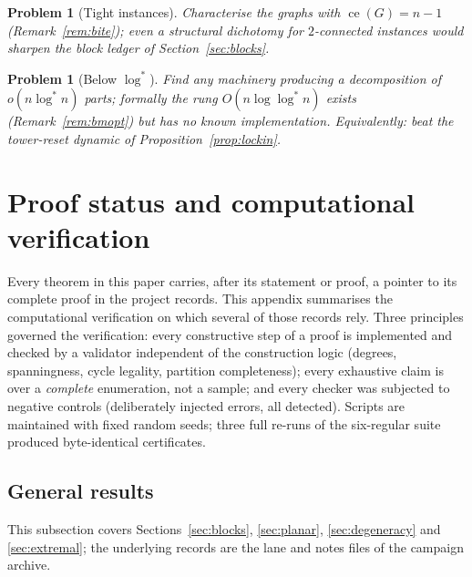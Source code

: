 \documentclass[a4paper,11pt]{amsart}
\newtheorem{problem}[theorem]{Problem}
\theoremstyle{definition}
\theoremstyle{remark}
\newcommand{\ce}{\operatorname{ce}}
\begin{document}
\begin{problem}[Tight instances]\label{prob:tight}
Characterise the graphs with $\ce(G)=n-1$ (Remark~\ref{rem:bite}); even a structural dichotomy for
$2$-connected instances would sharpen the block ledger of Section~\ref{sec:blocks}.
\end{problem}

\begin{problem}[Below $\log^*$]\label{prob:belowlogstar}
Find any machinery producing a decomposition of $o(n\log^* n)$ parts; formally the rung
$O(n\log\log^*n)$ exists (Remark~\ref{rem:bmopt}) but has no known implementation. Equivalently: beat the
tower-reset dynamic of Proposition~\ref{prop:lockin}.
\end{problem}

\appendix
\section{Proof status and computational verification}\label{app:verify}

Every theorem in this paper carries, after its statement or proof, a pointer to its complete proof in the
project records. This appendix summarises the computational verification on which several of those
records rely. Three principles governed the verification: every constructive step of a proof is
implemented and checked by a validator independent of the construction logic (degrees, spanningness,
cycle legality, partition completeness); every exhaustive claim is over a \emph{complete} enumeration, not
a sample; and every checker was subjected to negative controls (deliberately injected errors, all
detected). Scripts are maintained with fixed random seeds; three full re-runs of the six-regular suite
produced byte-identical certificates.

\subsection*{General results}

This subsection covers Sections~\ref{sec:blocks}, \ref{sec:planar}, \ref{sec:degeneracy} and
\ref{sec:extremal}; the underlying records are the lane and notes files of the campaign archive.
\end{document}
